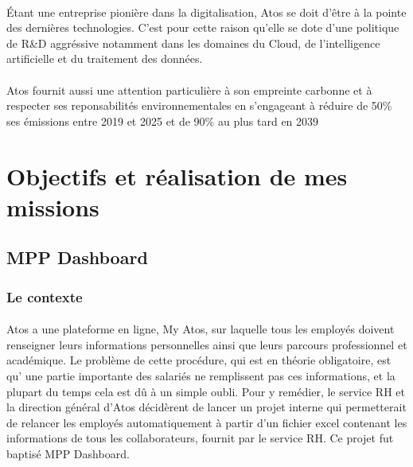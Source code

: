 \documentclass[12pt]{article}
\begin{document}
\begin {sloppypar}
\paragraph{}
Étant une entreprise pionière dans la digitalisation, Atos se doit d'être à la pointe
des dernières technologies. C'est pour cette raison qu'elle se dote d'une politique 
de R\&D aggréssive notamment dans les domaines du Cloud, de l'intelligence artificielle 
et du traitement des données.
\paragraph{}
Atos fournit aussi une attention particulière à son empreinte carbonne et à respecter ses reponsabilités environnementales
en s'engageant à réduire de 50\% ses émissions entre 2019 et 2025 et de 90\% au plus tard en 2039 
\newpage
\section {Objectifs et réalisation de mes missions}
\subsection {MPP Dashboard}
\subsubsection {Le contexte} \paragraph {}
Atos a une plateforme en ligne, My Atos, sur laquelle tous les employés doivent 
renseigner leurs informations personnelles ainsi que leurs parcours professionnel et 
académique. Le problème de cette procédure, qui est en théorie obligatoire, est qu' 
une partie importante des salariés ne remplissent pas ces informations, et la plupart 
du temps cela est dû à un simple oubli. Pour y remédier, le service RH et la direction 
général d'Atos décidèrent de lancer un projet interne qui permetterait de relancer 
les employés automatiquement à partir d'un fichier excel contenant les informations 
de tous les collaborateurs, fournit par le service RH. Ce projet fut baptisé MPP Dashboard.


\end{sloppypar}
\end{document}
